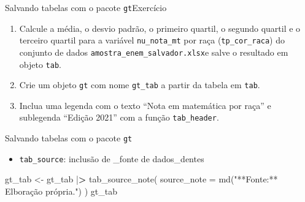 \documentclass[
  10pt,
  ignorenonframetext,
]{beamer}
\newenvironment{Shaded}{}{}
\newcommand{\DataTypeTok}[1]{#1}
\newcommand{\ErrorTok}[1]{\textcolor[rgb]{1.00,0.00,0.00}{\textbf{#1}}}
\newcommand{\KeywordTok}[1]{\textcolor[rgb]{0.00,0.00,1.00}{#1}}
\newcommand{\NormalTok}[1]{#1}
\newcommand{\OperatorTok}[1]{#1}
\newcommand{\StringTok}[1]{\textcolor[rgb]{0.00,0.50,0.50}{#1}}
\providecommand{\tightlist}{%
  \setlength{\itemsep}{0pt}\setlength{\parskip}{0pt}}
\begin{document}
\begin{frame}[fragile]{Salvando tabelas com o pacote
\texttt{gt}\newline Exercício}
\protect\hypertarget{salvando-tabelas-com-o-pacote-gtexercuxedcio}{}
\begin{enumerate}
\tightlist
\item
  Calcule a média, o desvio padrão, o primeiro quartil, o segundo
  quartil e o terceiro quartil para a variável \texttt{nu\_nota\_mt} por
  raça (\texttt{tp\_cor\_raca}) do conjunto de dados
  \texttt{amostra\_enem\_salvador.xlsx}e salve o resultado em objeto
  \texttt{tab}.
\item
  Crie um objeto \texttt{gt} com nome \texttt{gt\_tab} a partir da
  tabela em \texttt{tab}.
\item
  Inclua uma legenda com o texto ``Nota em matemática por raça'' e
  sublegenda ``Edição 2021'' com a função \texttt{tab\_header}.
\end{enumerate}
\end{frame}

\begin{frame}[fragile]{Salvando tabelas com o pacote \texttt{gt}}
\protect\hypertarget{salvando-tabelas-com-o-pacote-gt-3}{}
\begin{itemize}
\tightlist
\item
  \texttt{tab\_source}: inclusão de \_fonte de dados\_dentes
\end{itemize}

\begin{Shaded}
\begin{Highlighting}[]
\NormalTok{gt\_tab \textless{}{-}}\StringTok{ }\NormalTok{gt\_tab }\OperatorTok{|}\ErrorTok{\textgreater{}}
\StringTok{  }\KeywordTok{tab\_source\_note}\NormalTok{(}
    \DataTypeTok{source\_note =} \KeywordTok{md}\NormalTok{(}\StringTok{"**Fonte:** Elboração própria."}\NormalTok{)}
\NormalTok{  )}
\NormalTok{gt\_tab}
\end{Highlighting}
\end{Shaded}
\end{frame}
\end{document}

